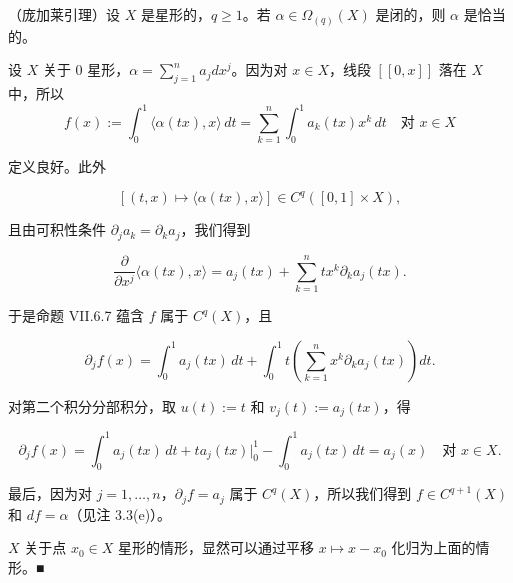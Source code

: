 \begin{theorem}

（庞加莱引理）设 $ X $ 是星形的，$ q \ge 1 $。若 $ \alpha \in \Omega_{(q)}(X) $ 是闭的，则 $ \alpha $ 是恰当的。

\proofhead
设 $ X $ 关于 $ 0 $ 星形，$ \alpha = \sum_{j=1}^{n}a_{j}dx^{j} $。因为对 $ x \in X $，线段 $ [[0,x]] $ 落在 $ X $ 中，所以
\begin{equation}
f(x) := \int_{0}^{1}\langle\alpha(tx),x\rangle\,dt = \sum_{k=1}^{n}\int_{0}^{1}a_{k}(tx)x^{k}\,dt \quad \text{对 } x \in X\tag{3.4}
\end{equation}

定义良好。此外

\[
[(t,x) \mapsto \langle\alpha(tx),x\rangle] \in C^{q}([0,1] \times X) ,
\]

且由可积性条件 $ \partial_{j}a_{k} = \partial_{k}a_{j} $，我们得到

\[
\frac{\partial}{\partial x^{j}}\langle\alpha(tx),x\rangle = a_{j}(tx) + \sum_{k=1}^{n}tx^{k}\partial_{k}a_{j}(tx) .
\]

于是命题 VII.6.7 蕴含 $ f $ 属于 $ C^{q}(X) $，且

\[
\partial_{j}f(x) = \int_{0}^{1}a_{j}(tx)\,dt + \int_{0}^{1}t\left(\sum_{k=1}^{n}x^{k}\partial_{k}a_{j}(tx)\right)dt .
\]

对第二个积分分部积分，取 $ u(t) := t $ 和 $ v_{j}(t) := a_{j}(tx) $，得

\[
\partial_{j}f(x) = \int_{0}^{1}a_{j}(tx)\,dt + ta_{j}(tx)|_{0}^{1} - \int_{0}^{1}a_{j}(tx)\,dt = a_{j}(x) \quad \text{对 } x \in X .
\]

最后，因为对 $ j = 1,\ldots,n $，$ \partial_{j}f = a_{j} $ 属于 $ C^{q}(X) $，所以我们得到 $ f \in C^{q+1}(X) $ 和 $ df = \alpha $（见注 3.3(e)）。

$ X $ 关于点 $ x_{0} \in X $ 星形的情形，显然可以通过平移 $ x \mapsto x - x_{0} $ 化归为上面的情形。\nobreak\hspace{0.35em}■

\end{theorem}

